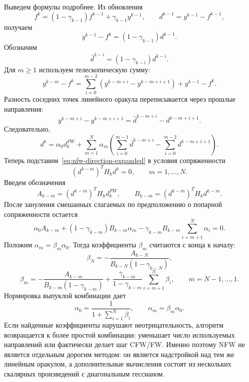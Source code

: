 Выведем формулы подробнее.
Из обновления
\[
    f^k=(1-\gamma_{k-1})f^{k-1}+\gamma_{k-1}y^{k-1},
    \qquad
    d^{k-1}=y^{k-1}-f^{k-1},
\]
получаем
\[
    y^{k-1}-f^k=(1-\gamma_{k-1})d^{k-1}.
\]
Обозначим
\[
    \bar d^{k-i}=(1-\gamma_{k-i})d^{k-i}.
\]
Для $m\geq 1$ используем телескопическую сумму:
\[
    y^{k-m}-f^k
    =
    \sum_{i=0}^{m-2}
    \left(y^{k-m+i}-y^{k-m+i+1}\right)
    +
    y^{k-1}-f^k .
\]
Разность соседних точек линейного оракула переписывается через прошлые направления:
\[
    y^{k-m+i}-y^{k-m+i+1}
    =
    \bar d^{k-m+i}-d^{k-m+i+1}.
\]
Следовательно,
\begin{equation}
    d^k
    =
    \alpha_0d_k^{FW}
    +
    \sum_{m=1}^{N}
    \alpha_m
    \left(
        \sum_{i=0}^{m-1}\bar d^{k-m+i}
        -
        \sum_{i=0}^{m-2}d^{k-m+i+1}
    \right).
    \label{eq:nfw-direction-expanded}
\end{equation}
Теперь подставим~\eqref{eq:nfw-direction-expanded} в условия сопряженности
\[
    (d^{k-m})^T H_k d^k=0,
    \qquad m=1,\ldots,N.
\]
Введем обозначения
\[
    A_{k-m}=(d^{k-m})^T H_k d_k^{FW},
    \qquad
    B_{k-m}=(d^{k-m})^T H_k d^{k-m}.
\]
После зануления смешанных слагаемых по предположению о попарной сопряженности остается
\begin{equation}
    \alpha_0A_{k-m}
    +
    (1-\gamma_{k-m})B_{k-m}\alpha_m
    -
    \gamma_{k-m}B_{k-m}
    \sum_{i=m+1}^{N}\alpha_i
    =
    0.
    \label{eq:nfw-alpha-system}
\end{equation}
Положим $\alpha_m=\beta_m\alpha_0$.
Тогда коэффициенты $\beta_m$ считаются с конца к началу:
\begin{equation}
    \beta_N
    =
    -\frac{A_{k-N}}{B_{k-N}(1-\gamma_{k-N})},
    \label{eq:nfw-beta-last}
\end{equation}
\begin{equation}
    \beta_m
    =
    -\frac{A_{k-m}}{B_{k-m}(1-\gamma_{k-m})}
    +
    \frac{\gamma_{k-m}}{1-\gamma_{k-m}}
    \sum_{i=m+1}^{N}\beta_i,
    \qquad m=N-1,\ldots,1.
    \label{eq:nfw-beta-recursion}
\end{equation}
Нормировка выпуклой комбинации дает
\begin{equation}
    \alpha_0=
    \frac{1}{1+\sum_{i=1}^{N}\beta_i},
    \qquad
    \alpha_m=\beta_m\alpha_0.
    \label{eq:nfw-alpha-normalization}
\end{equation}
Если найденные коэффициенты нарушают неотрицательность, алгоритм возвращается к более простой
комбинации: уменьшает число используемых направлений или фактически делает шаг CFW/FW.
Именно поэтому NFW не является отдельным дорогим методом: он является надстройкой над тем же
линейным оракулом, а дополнительные вычисления состоят из нескольких скалярных произведений с
диагональным гессианом.

